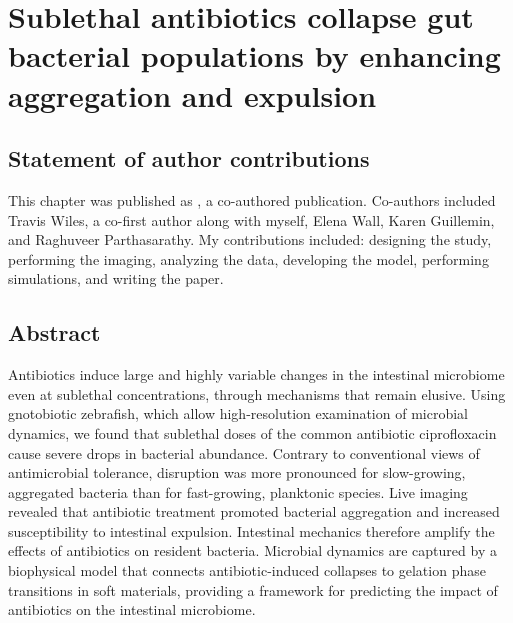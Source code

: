 
\def\reals{\mathbb{R}}
\def\be{\begin{equation}}
\def\ee{\end{equation}}
\def\bea{\begin{eqnarray}}
\def\eea{\end{eqnarray}}
\def\bml{\begin{mathletters}}
\def\eml{\end{mathletters}}
\def\bse{\begin{subequations}}
\def\ese{\end{subequations}}
\def\expec{\mathbb{E}}
\def\exp{\text{exp}}
\def\Var{\text{Var}}
\def\e{\text{e}}
\def\ba{\begin{align}}
\def\ea{\end{align}}

\chapter{Sublethal antibiotics collapse gut bacterial populations by enhancing aggregation and expulsion}

\section{Statement of author contributions}
This chapter was published as \cite{schlomann_sublethal_2019}, a co-authored publication. Co-authors included Travis Wiles, a co-first author along with myself, Elena Wall, Karen Guillemin, and Raghuveer Parthasarathy. My contributions included: designing the study, performing the imaging, analyzing the data, developing the model, performing simulations, and writing the paper. 

\section{Abstract}
Antibiotics induce large and highly variable changes in the intestinal microbiome even at sublethal concentrations, through mechanisms that remain elusive. Using gnotobiotic zebrafish, which allow high-resolution examination of microbial dynamics, we found that sublethal doses of the common antibiotic ciprofloxacin cause severe drops in bacterial abundance. Contrary to conventional views of antimicrobial tolerance, disruption was more pronounced for slow-growing, aggregated bacteria than for fast-growing, planktonic species. Live imaging revealed that antibiotic treatment promoted bacterial aggregation and increased susceptibility to intestinal expulsion. Intestinal mechanics therefore amplify the effects of antibiotics on resident bacteria. Microbial dynamics are captured by a biophysical model that connects antibiotic-induced collapses to gelation phase transitions in soft materials, providing a framework for predicting the impact of antibiotics on the intestinal microbiome.












